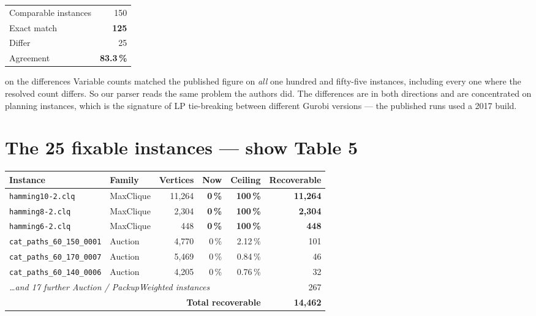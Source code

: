 \documentclass[11pt,a4paper]{article}
\newcommand{\good}[1]{\textcolor{okgreen}{\textbf{#1}}}
\newcommand{\bad}[1]{\textcolor{warnred}{\textbf{#1}}}
\begin{document}
\begin{center}
\begin{tabular}{@{}lr@{}}
\toprule
Comparable instances & 150 \\
Exact match & \good{125} \\
Differ & 25 \\
Agreement & \good{83.3\,\%} \\
\bottomrule
\end{tabular}
\end{center}

\begin{say}{on the differences}
Variable counts matched the published figure on \emph{all} one hundred and fifty-five instances,
including every one where the resolved count differs. So our parser reads the same problem the
authors did. The differences are in both directions and are concentrated on planning instances,
which is the signature of LP tie-breaking between different Gurobi versions --- the published runs
used a 2017 build.
\end{say}

\section{The 25 fixable instances --- show Table 5}

\begin{center}
\small
\begin{tabular}{@{}llrrrr@{}}
\toprule
Instance & Family & Vertices & Now & Ceiling & Recoverable \\
\midrule
\texttt{hamming10-2.clq} & MaxClique & 11{,}264 & \bad{0\,\%} & \good{100\,\%} & \textbf{11{,}264} \\
\texttt{hamming8-2.clq}  & MaxClique &  2{,}304 & \bad{0\,\%} & \good{100\,\%} & \textbf{2{,}304} \\
\texttt{hamming6-2.clq}  & MaxClique &    448 & \bad{0\,\%} & \good{100\,\%} & \textbf{448} \\
\texttt{cat\_paths\_60\_150\_0001} & Auction & 4{,}770 & 0\,\% & 2.12\,\% & 101 \\
\texttt{cat\_paths\_60\_170\_0007} & Auction & 5{,}469 & 0\,\% & 0.84\,\% & 46 \\
\texttt{cat\_paths\_60\_140\_0006} & Auction & 4{,}205 & 0\,\% & 0.76\,\% & 32 \\
\multicolumn{4}{l}{\emph{\ldots and 17 further Auction / PackupWeighted instances}} & & 267 \\
\midrule
\multicolumn{5}{r}{\textbf{Total recoverable}} & \textbf{14{,}462} \\
\bottomrule
\end{tabular}
\end{center}
\end{document}
